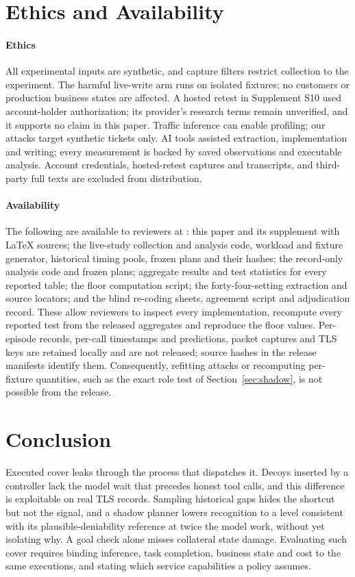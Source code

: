 \section{Ethics and Availability}\label{sec:validity}
\paragraph{Ethics}
All experimental inputs are synthetic, and capture filters restrict collection to the experiment. The harmful live-write arm runs on isolated fixtures; no customers or production business states are affected. A hosted retest in Supplement S10 used account-holder authorization; its provider's research terms remain unverified, and it supports no claim in this paper. Traffic inference can enable profiling; our attacks target synthetic tickets only. AI tools assisted extraction, implementation and writing; every measurement is backed by saved observations and executable analysis. Account credentials, hosted-retest captures and transcripts, and third-party full texts are excluded from distribution.

\paragraph{Availability}
The following are available to reviewers at \artifacturl: this paper and its supplement with LaTeX sources; the live-study collection and analysis code, workload and fixture generator, historical timing pools, frozen plans and their hashes; the record-only analysis code and frozen plans; aggregate results and test statistics for every reported table; the floor computation script; the forty-four-setting extraction and source locators; and the blind re-coding sheets, agreement script and adjudication record. These allow reviewers to inspect every implementation, recompute every reported test from the released aggregates and reproduce the floor values. Per-episode records, per-call timestamps and predictions, packet captures and TLS keys are retained locally and are not released; source hashes in the release manifests identify them. Consequently, refitting attacks or recomputing per-fixture quantities, such as the exact role test of Section~\ref{sec:shadow}, is not possible from the release.

\section{Conclusion}
Executed cover leaks through the process that dispatches it. Decoys inserted by a controller lack the model wait that precedes honest tool calls, and this difference is exploitable on real TLS records. Sampling historical gaps hides the shortcut but not the signal, and a shadow planner lowers recognition to a level consistent with its plausible-deniability reference at twice the model work, without yet isolating why. A goal check alone misses collateral state damage. Evaluating such cover requires binding inference, task completion, business state and cost to the same executions, and stating which service capabilities a policy assumes.
